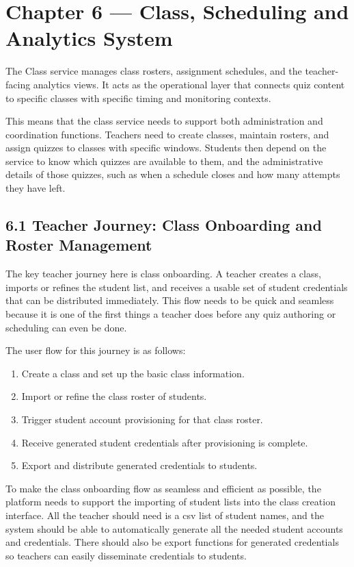 \documentclass[
  12pt,
  a4paper,
]{report}
\begin{document}
\hypertarget{chapter-6-class-scheduling-and-analytics-system}{%
\chapter{Chapter 6 --- Class, Scheduling and Analytics
System}\label{chapter-6-class-scheduling-and-analytics-system}}

The Class service manages class rosters, assignment schedules, and the
teacher-facing analytics views. It acts as the operational layer that
connects quiz content to specific classes with specific timing and
monitoring contexts.

This means that the class service needs to support both administration
and coordination functions. Teachers need to create classes, maintain
rosters, and assign quizzes to classes with specific windows. Students
then depend on the service to know which quizzes are available to them,
and the administrative details of those quizzes, such as when a schedule
closes and how many attempts they have left.

\hypertarget{class-and-roster-management}{%
\section{6.1 Teacher Journey: Class Onboarding and Roster
Management}\label{class-and-roster-management}}

The key teacher journey here is class onboarding. A teacher creates a
class, imports or refines the student list, and receives a usable set of
student credentials that can be distributed immediately. This flow needs
to be quick and seamless because it is one of the first things a teacher does
before any quiz authoring or scheduling can even be done.

The user flow for this journey is as follows:
\begin{enumerate}
  \item Create a class and set up the basic class information.
  \item Import or refine the class roster of students.
  \item Trigger student account provisioning for that class roster.
  \item Receive generated student credentials after provisioning is complete.
  \item Export and distribute generated credentials to students.
\end{enumerate}

To make the class onboarding flow as seamless and efficient as possible,
the platform needs to support the importing of student lists into the class creation
interface. All the teacher should need is a csv list of student names, and the system should be
able to automatically generate all the needed student accounts and credentials.
There should also be export functions for generated credentials so teachers can easily
disseminate credentials to students.
\end{document}
